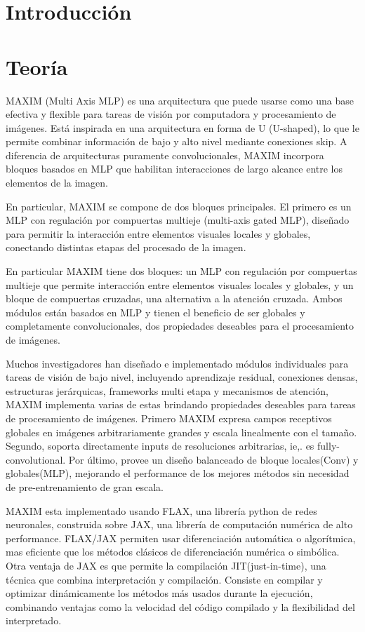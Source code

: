 \documentclass[aps,prl,twocolumn,groupedaddress]{revtex4-2}
\begin{document}
\section{Introducción}


\section{Teoría}

MAXIM (Multi Axis MLP) es una arquitectura que puede usarse como una base efectiva  y flexible para tareas de visión por computadora y procesamiento de imágenes. Está inspirada en una arquitectura en forma de U (U-shaped), lo que le permite combinar información de bajo y alto nivel mediante conexiones skip. A diferencia de arquitecturas puramente convolucionales, MAXIM incorpora bloques basados en MLP que habilitan interacciones de largo alcance entre los elementos de la imagen.

En particular, MAXIM se compone de dos bloques principales. El primero es un MLP con regulación por compuertas multieje (multi-axis gated MLP), diseñado para permitir la interacción entre elementos visuales locales y globales, conectando distintas etapas del procesado de la imagen.

En particular MAXIM tiene dos bloques: un MLP con regulación por compuertas multieje que permite interacción entre elementos visuales locales y globales, y un bloque de compuertas cruzadas, una alternativa a la atención cruzada. Ambos módulos están basados en MLP y tienen el beneficio de ser globales y completamente convolucionales, dos propiedades deseables para el procesamiento de imágenes.

Muchos investigadores han diseñado e implementado módulos individuales  para tareas de visión de bajo nivel, incluyendo aprendizaje residual, conexiones densas, estructuras jerárquicas, frameworks multi etapa y mecanismos de atención, MAXIM implementa varias de estas brindando propiedades deseables para tareas de procesamiento de imágenes. Primero MAXIM expresa campos receptivos globales en imágenes arbitrariamente grandes y escala linealmente con el tamaño. Segundo, soporta directamente inputs de resoluciones arbitrarias, ie,. es fully-convolutional. Por último, provee un diseño balanceado de bloque locales(Conv) y globales(MLP), mejorando el performance de los mejores métodos sin necesidad de pre-entrenamiento de gran escala.

MAXIM esta implementado usando FLAX, una librería python de redes neuronales, construida sobre JAX, una librería de computación numérica de alto performance. FLAX/JAX permiten usar diferenciación automática o algorítmica, mas eficiente que los métodos clásicos de diferenciación numérica o simbólica. Otra ventaja de JAX es que permite la compilación JIT(just-in-time), una técnica que combina interpretación y compilación. Consiste en compilar y optimizar dinámicamente los métodos más usados durante la ejecución, combinando ventajas como la velocidad del código compilado y la flexibilidad del interpretado.
\end{document}
